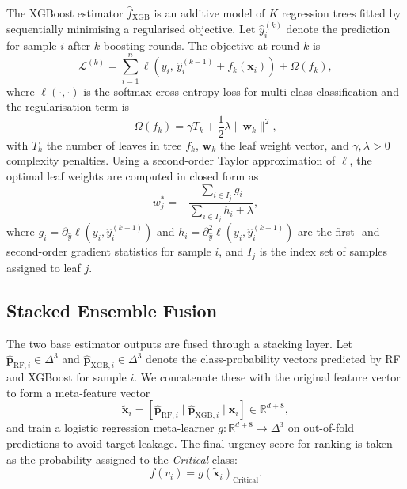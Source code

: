 \documentclass[review,12pt]{elsarticle}
\begin{document}
The XGBoost \citep{chen2016xgboost} estimator $\hat{f}_{\text{XGB}}$ is an additive model of $K$ regression trees fitted by sequentially minimising a regularised objective. Let $\hat{y}_i^{(k)}$ denote the prediction for sample $i$ after $k$ boosting rounds. The objective at round $k$ is
\begin{equation}
  \mathcal{L}^{(k)} = \sum_{i=1}^{n} \ell\!\left(y_i,\, \hat{y}_i^{(k-1)} + f_k(\mathbf{x}_i)\right) + \Omega(f_k),
  \label{eq:xgb_obj}
\end{equation}
where $\ell(\cdot,\cdot)$ is the softmax cross-entropy loss for multi-class classification and the regularisation term is
\begin{equation}
  \Omega(f_k) = \gamma T_k + \frac{1}{2}\lambda\|\mathbf{w}_k\|^2,
  \label{eq:xgb_reg}
\end{equation}
with $T_k$ the number of leaves in tree $f_k$, $\mathbf{w}_k$ the leaf weight vector, and $\gamma, \lambda > 0$ complexity penalties. Using a second-order Taylor approximation of $\ell$, the optimal leaf weights are computed in closed form as
\begin{equation}
  w_j^* = -\frac{\sum_{i \in I_j} g_i}{\sum_{i \in I_j} h_i + \lambda},
  \label{eq:xgb_leaf}
\end{equation}
where $g_i = \partial_{\hat{y}} \ell(y_i, \hat{y}_i^{(k-1)})$ and $h_i = \partial^2_{\hat{y}} \ell(y_i, \hat{y}_i^{(k-1)})$ are the first- and second-order gradient statistics for sample $i$, and $I_j$ is the index set of samples assigned to leaf $j$.

\subsection{Stacked Ensemble Fusion}

The two base estimator outputs are fused through a stacking layer. Let $\hat{\mathbf{p}}_{\text{RF},i} \in \Delta^3$ and $\hat{\mathbf{p}}_{\text{XGB},i} \in \Delta^3$ denote the class-probability vectors predicted by RF and XGBoost for sample $i$. We concatenate these with the original feature vector to form a meta-feature vector
\begin{equation}
  \tilde{\mathbf{x}}_i = \left[\hat{\mathbf{p}}_{\text{RF},i}\;\Big|\;\hat{\mathbf{p}}_{\text{XGB},i}\;\Big|\;\mathbf{x}_i\right] \in \mathbb{R}^{d+8},
  \label{eq:meta}
\end{equation}
and train a logistic regression meta-learner $g: \mathbb{R}^{d+8} \rightarrow \Delta^3$ on out-of-fold predictions to avoid target leakage. The final urgency score for ranking is taken as the probability assigned to the \textit{Critical} class:
\begin{equation}
  f(v_i) = g(\tilde{\mathbf{x}}_i)_{\text{Critical}}.
  \label{eq:final_score}
\end{equation}
\end{document}
